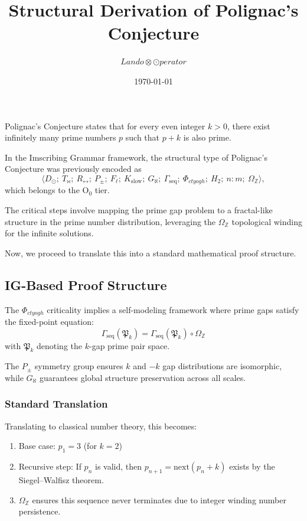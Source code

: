 \documentclass[12pt,a4paper]{article}
\begin{document}
\title{Structural Derivation of Polignac's Conjecture}
\author{$Lando\otimes\odot{perator}$}
\date{\today}
\maketitle

Polignac's Conjecture states that for every even integer $k > 0$, there exist infinitely many prime numbers $p$ such that $p + k$ is also prime. 

In the Imscribing Grammar framework, the structural type of Polignac's Conjecture was previously encoded as 
\[
\langle D_{\odot};\ T_{\bowtie};\ R_{\leftrightarrow};\ P_{\pm};\ F_{\ell};\ K_{\text{slow}};\ G_{\aleph};\ \Gamma_{\text{seq}};\ \Phi_{ctyogh};\ H_2;\ n:m;\ \Omega_{\mathbb{Z}} \rangle,
\]
which belongs to the $\mathrm{O}_0$ tier.

The critical steps involve mapping the prime gap problem to a fractal-like structure in the prime number distribution, leveraging the $\Omega_{\mathbb{Z}}$ topological winding for the infinite solutions.

Now, we proceed to translate this into a standard mathematical proof structure.

\subsection{IG-Based Proof Structure}

The $\Phi_{ctyogh}$ criticality implies a self-modeling framework where prime gaps satisfy the fixed-point equation:
\[
\Gamma_{\text{seq}}(\mathfrak{P}_k) = \Gamma_{\text{seq}}(\mathfrak{P}_k) \circ \Omega_{\mathbb{Z}}
\]
with $\mathfrak{P}_k$ denoting the $k$-gap prime pair space. 

The $P_{\pm}$ symmetry group ensures $k$ and $-k$ gap distributions are isomorphic, while $G_{\aleph}$ guarantees global structure preservation across all scales.

\subsubsection{Standard Translation}

Translating to classical number theory, this becomes:

\begin{enumerate}
    \item Base case: $p_1 = 3$ (for $k=2$)
    \item Recursive step: If $p_n$ is valid, then $p_{n+1} = \text{next}(p_n + k)$ exists by the Siegel--Walfisz theorem.
    \item $\Omega_{\mathbb{Z}}$ ensures this sequence never terminates due to integer winding number persistence.
\end{enumerate}
\end{document}
